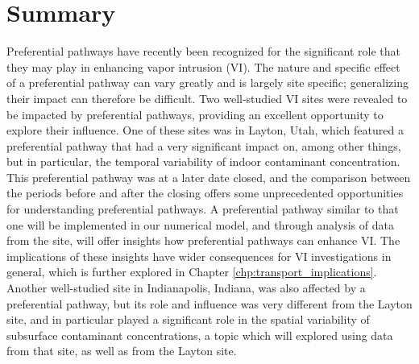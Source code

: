 \section{Summary}

Preferential pathways have recently been recognized for the significant role that they may play in enhancing vapor intrusion (VI).
The nature and specific effect of a preferential pathway can vary greatly and is largely site specific; generalizing their impact can therefore be difficult.
Two well-studied VI sites were revealed to be impacted by preferential pathways, providing an excellent opportunity to explore their influence.
One of these sites was in Layton, Utah, which featured a preferential pathway that had a very significant impact on, among other things, but in particular, the temporal variability of indoor contaminant concentration.
This preferential pathway was at a later date closed, and the comparison between the periods before and after the closing offers some unprecedented opportunities for understanding preferential pathways.
A preferential pathway similar to that one will be implemented in our numerical model, and through analysis of data from the site, will offer insights how preferential pathways can enhance VI.
The implications of these insights have wider consequences for VI investigations in general, which is further explored in Chapter \ref{chp:transport_implications}.
Another well-studied site in Indianapolis, Indiana, was also affected by a preferential pathway, but its role and influence was very different from the Layton site, and in particular played a significant role in the spatial variability of subsurface contaminant concentrations, a topic which will explored using data from that site, as well as from the Layton site.
